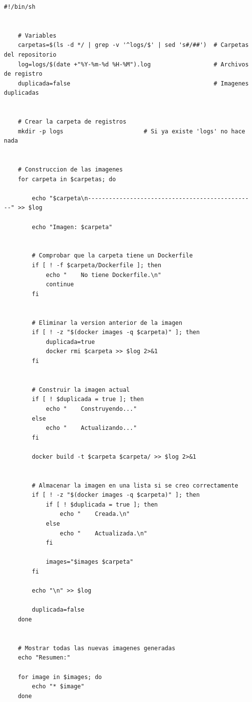             \begin{lstlisting}[style=bash_style, basicstyle=\ttfamily\scriptsize]
    #!/bin/sh


    # Variables
    carpetas=$(ls -d */ | grep -v '^logs/$' | sed 's#/##')  # Carpetas del repositorio
    log=logs/$(date +"%Y-%m-%d %H-%M").log                  # Archivos de registro
    duplicada=false                                         # Imagenes duplicadas


    # Crear la carpeta de registros
    mkdir -p logs                       # Si ya existe 'logs' no hace nada


    # Construccion de las imagenes
    for carpeta in $carpetas; do

        echo "$carpeta\n------------------------------------------------" >> $log

        echo "Imagen: $carpeta"


        # Comprobar que la carpeta tiene un Dockerfile
        if [ ! -f $carpeta/Dockerfile ]; then
            echo "    No tiene Dockerfile.\n"
            continue
        fi
    
    
        # Eliminar la version anterior de la imagen
        if [ ! -z "$(docker images -q $carpeta)" ]; then
            duplicada=true
            docker rmi $carpeta >> $log 2>&1
        fi


        # Construir la imagen actual
        if [ ! $duplicada = true ]; then
            echo "    Construyendo..."
        else
            echo "    Actualizando..."
        fi

        docker build -t $carpeta $carpeta/ >> $log 2>&1


        # Almacenar la imagen en una lista si se creo correctamente
        if [ ! -z "$(docker images -q $carpeta)" ]; then
            if [ ! $duplicada = true ]; then
                echo "    Creada.\n"
            else
                echo "    Actualizada.\n"
            fi

            images="$images $carpeta"
        fi

        echo "\n" >> $log

        duplicada=false
    done


    # Mostrar todas las nuevas imagenes generadas
    echo "Resumen:"

    for image in $images; do
        echo "* $image"
    done                
            \end{lstlisting}

            \newpage

